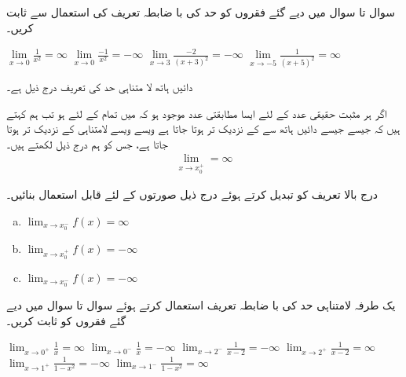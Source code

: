  سوال  تا سوال  میں دیے گئے فقروں کو حد کی با ضابطہ تعریف کی استعمال سے ثابت کریں۔

$\lim\limits_{x\to 0}\tfrac{1}{x^2}=\infty$
$\lim\limits_{x\to 0}\tfrac{-1}{x^2}=-\infty$
$\lim\limits_{x\to 3}\tfrac{-2}{(x+3)^2}=-\infty$
$\lim\limits_{x\to -5}\tfrac{1}{(x+5)^2}=\infty$

دائیں ہاتھ لا متناہی حد کی تعریف درج ذیل ہے۔

اگر ہر مثبت حقیقی عدد  کے لئے ایسا مطابقتی عدد  موجود ہو کہ  میں تمام  کے لئے  ہو تب ہم کہتے ہیں کہ جیسے جیسے  دائیں ہاتھ سے   کے نزدیک تر ہوتا جاتا ہے ویسے ویسے  لامتناہی کے نزدیک تر ہوتا جاتا ہے، جس کو ہم درج ذیل لکھتے ہیں۔
\begin{align*}
\lim_{x\to x_0^+}=\infty
\end{align*}

درج بالا تعریف کو تبدیل کرتے ہوئے درج ذیل صورتوں کے لئے قابل استعمال بنائیں۔
\begin{multicols}{2}
\begin{enumerate}[a.]
\item
$\lim_{x\to x_0^-}f(x)=\infty$
\item
$\lim_{x\to x_0^+}f(x)=-\infty$
\item
$\lim_{x\to x_0^-}f(x)=-\infty$
\end{enumerate}
\end{multicols}

یک طرفہ لامتناہی حد کی با ضابطہ تعریف استعمال کرتے ہوئے سوال  تا سوال  میں دیے گئے فقروں کو ثابت کریں۔ 

$\lim_{x\to 0^+}\tfrac{1}{x}=\infty$
$\lim_{x\to 0^-}\tfrac{1}{x}=-\infty$
$\lim_{x\to 2^-}\tfrac{1}{x-2}=-\infty$
$\lim_{x\to 2^+}\tfrac{1}{x-2}=\infty$
$\lim_{x\to 1^+}\tfrac{1}{1-x^2}=-\infty$
$\lim_{x\to 1^-}\tfrac{1}{1-x^2}=\infty$



